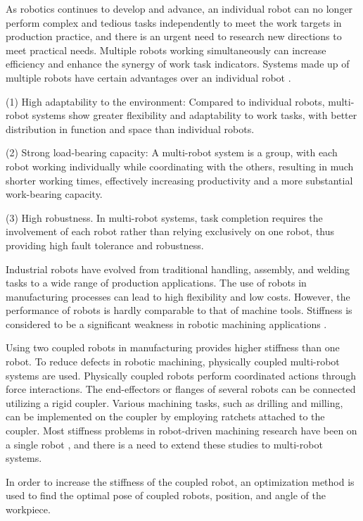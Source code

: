As robotics continues to develop and advance, an individual robot can no longer perform complex and tedious tasks independently to meet the work targets in production practice, and there is an urgent need to research new directions to meet practical needs. Multiple robots working simultaneously can increase efficiency and enhance the synergy of work task indicators. Systems made up of multiple robots have certain advantages over an individual robot \cite{PFRCD}.

	(1) High adaptability to the environment: Compared to individual robots, multi-robot systems show greater flexibility and adaptability to work tasks, with better distribution in function and space than individual robots.

	(2) Strong load-bearing capacity: A multi-robot system is a group, with each robot working individually while coordinating with the others, resulting in much shorter working times, effectively increasing productivity and a more substantial work-bearing capacity.
	
	(3) High robustness. In multi-robot systems, task completion requires the involvement of each robot rather than relying exclusively on one robot, thus providing high fault tolerance and robustness.

Industrial robots have evolved from traditional handling, assembly, and welding tasks to a wide range of production applications. The use of robots in manufacturing processes can lead to high flexibility and low costs. However, the performance of robots is hardly comparable to that of machine tools. Stiffness is considered to be a significant weakness in robotic machining applications \cite{MIIR}.

Using two coupled robots in manufacturing provides higher stiffness than one robot. To reduce defects in robotic machining, physically coupled multi-robot systems are used. Physically coupled robots perform coordinated actions through force interactions. The end-effectors or flanges of several robots can be connected utilizing a rigid coupler. Various machining tasks, such as drilling and milling, can be implemented on the coupler by employing ratchets attached to the coupler. Most stiffness problems in robot-driven machining research have been on a single robot \cite{WPOIR} \cite{POMIR}  \cite{SOPO}, and there is a need to extend these studies to multi-robot systems. 

In order to increase the stiffness of the coupled robot, an optimization method is used to find the optimal pose of coupled robots, position, and angle of the workpiece.



